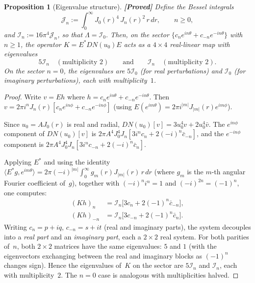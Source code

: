 \documentclass[12pt]{article}
\newtheorem{proposition}[theorem]{Proposition}
\theoremstyle{definition}
\theoremstyle{remark}
\newcommand{\proven}{\textbf{\color{teal}[Proved]}}
\begin{document}
\begin{proposition}[Eigenvalue structure]
  \label{prop:eigenvalues}
  \proven\quad
  Define the Bessel integrals
  \begin{equation}  \label{eq:Jn-def}
    \mathcal J_n := \int_0^\infty J_0(r)^4\,J_n(r)^2\,r\,dr,
    \qquad n\geq 0,
  \end{equation}
  and $\mathcal I_n:=16\pi^4\mathcal J_n$, so that $\Lambda=\mathcal I_0$.
  Then, on the sector $\{c_ne^{in\theta}+c_{-n}e^{-in\theta}\}$ with
  $n\geq 1$, the operator $K=E^*DN(u_0)E$ acts as a $4\times 4$
  real-linear map with eigenvalues
  \[
    5\mathcal I_n\quad(\text{multiplicity }2)
    \qquad\text{and}\qquad
    \mathcal I_n\quad(\text{multiplicity }2).
  \]
  On the sector $n=0$, the eigenvalues are $5\mathcal I_0$ (for real
  perturbations) and $\mathcal I_0$ (for imaginary perturbations), each
  with multiplicity~$1$.
\end{proposition}

\begin{proof}
  Write $v=Eh$ where $h=c_ne^{in\theta}+c_{-n}e^{-in\theta}$.  Then
  $v=2\pi i^n J_n(r)[c_ne^{in\phi}+c_{-n}e^{-in\phi}]$
  (using $E(e^{im\theta})=2\pi i^{|m|}J_{|m|}(r)e^{im\phi}$).

  Since $u_0=AJ_0(r)$ is real and radial,
  $DN(u_0)[v]=3u_0^4 v+2u_0^4\bar v$. The $e^{in\phi}$ component of
  $DN(u_0)[v]$ is $2\pi A^4J_0^4J_n[3i^nc_n+2(-i)^n\bar c_{-n}]$,
  and the $e^{-in\phi}$ component is
  $2\pi A^4J_0^4J_n[3i^nc_{-n}+2(-i)^n\bar c_n]$.

  Applying $E^*$ and using the identity
  $\langle E^*g,e^{im\theta}\rangle=2\pi(-i)^{|m|}\int_0^\infty
  g_m(r)J_{|m|}(r)\,r\,dr$
  (where $g_m$ is the $m$-th angular Fourier coefficient of~$g$),
  together with $(-i)^ni^n=1$ and $(-i)^{2n}=(-1)^n$, one computes:
  \begin{align}
    (Kh)_n &= \mathcal I_n\bigl[3c_n+2(-1)^n\bar c_{-n}\bigr],
    \label{eq:Kn}\\
    (Kh)_{-n} &= \mathcal I_n\bigl[3c_{-n}+2(-1)^n\bar c_n\bigr].
    \label{eq:K-n}
  \end{align}
  Writing $c_n=p+iq$, $c_{-n}=s+it$ (real and imaginary parts), the system
  decouples into a \emph{real part} and an \emph{imaginary part}, each a
  $2\times 2$ real system.  For both parities of~$n$, both $2\times 2$
  matrices have the same eigenvalues: $5$ and $1$ (with the eigenvectors
  exchanging between the real and imaginary blocks as $(-1)^n$ changes sign).
  Hence the eigenvalues of~$K$ on the sector are $5\mathcal I_n$ and
  $\mathcal I_n$, each with multiplicity~$2$.
  The $n=0$ case is analogous with multiplicities halved.
\end{proof}
\end{document}
